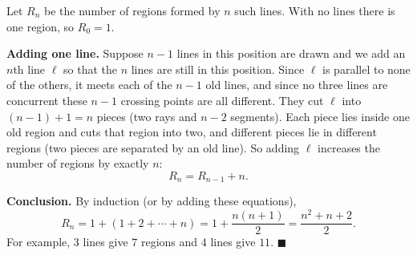 Let $R_n$ be the number of regions formed by $n$ such lines. With no lines there is one region, so $R_0=1$.

\textbf{Adding one line.} Suppose $n-1$ lines in this position are drawn and we add an $n$th line $\ell$ so that the $n$ lines are still in this position. Since $\ell$ is parallel to none of the others, it meets each of the $n-1$ old lines, and since no three lines are concurrent these $n-1$ crossing points are all different. They cut $\ell$ into $(n-1)+1=n$ pieces (two rays and $n-2$ segments). Each piece lies inside one old region and cuts that region into two, and different pieces lie in different regions (two pieces are separated by an old line). So adding $\ell$ increases the number of regions by exactly $n$:
\[
R_n=R_{n-1}+n .
\]

\textbf{Conclusion.} By induction (or by adding these equations),
\[
R_n=1+(1+2+\cdots+n)=1+\dfrac{n(n+1)}{2}=\dfrac{n^2+n+2}{2}.
\]
For example, $3$ lines give $7$ regions and $4$ lines give $11$. $\blacksquare$

